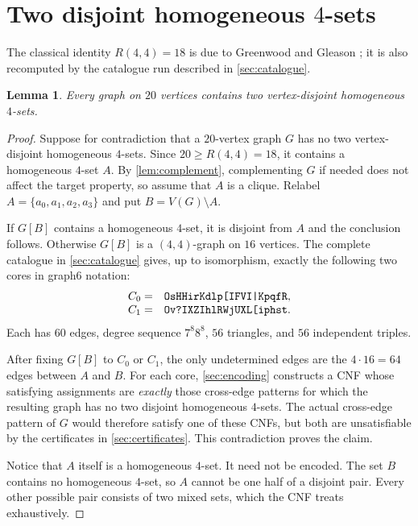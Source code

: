 \documentclass[11pt,a4paper]{article}
\newtheorem{lemma}[theorem]{Lemma}
\theoremstyle{definition}
\theoremstyle{remark}
\newcommand{\corezero}{\texttt{\detokenize{OsHHirKdlp[IFVI|KpqfR}}}
\newcommand{\coreone}{\texttt{\detokenize{Ov?IXZIhlRWjUXL[iphst}}}
\begin{document}
\section{\texorpdfstring{Two disjoint homogeneous \(4\)-sets}{Two disjoint homogeneous 4-sets}}

The classical identity \(R(4,4)=18\) is due to Greenwood and Gleason
\cite{greenwood-gleason}; it is also recomputed by the catalogue run
described in \cref{sec:catalogue}.

\begin{lemma}\label{lem:two-homfour}
Every graph on \(20\) vertices contains two vertex-disjoint homogeneous
\(4\)-sets.
\end{lemma}

\begin{proof}
Suppose for contradiction that a \(20\)-vertex graph \(G\) has no two
vertex-disjoint homogeneous \(4\)-sets.  Since \(20\geq R(4,4)=18\), it contains a
homogeneous \(4\)-set \(A\).  By \cref{lem:complement}, complementing \(G\)
if needed does not affect the target property, so assume that \(A\) is a
clique.  Relabel \(A=\{a_0,a_1,a_2,a_3\}\) and put
\(B=V(G)\setminus A\).

If \(G[B]\) contains a homogeneous \(4\)-set, it is disjoint from \(A\) and
the conclusion follows.  Otherwise \(G[B]\) is a \((4,4)\)-graph on
\(16\) vertices.  The complete catalogue in
\cref{sec:catalogue} gives, up to isomorphism, exactly the following two
cores in graph6 notation:
\[
\begin{array}{ll}
C_0=&\corezero,\\
C_1=&\coreone.
\end{array}
\]
Each has \(60\) edges, degree sequence \(7^8 8^8\), \(56\) triangles, and
\(56\) independent triples.

After fixing \(G[B]\) to \(C_0\) or \(C_1\), the only undetermined edges are
the \(4\cdot16=64\) edges between \(A\) and \(B\).  For each core,
\cref{sec:encoding} constructs a CNF whose satisfying assignments are
\emph{exactly} those cross-edge patterns for which the resulting graph has
no two disjoint homogeneous \(4\)-sets.  The actual cross-edge pattern of
\(G\) would therefore satisfy one of these CNFs, but both are unsatisfiable
by the certificates in \cref{sec:certificates}.  This contradiction proves
the claim.

Notice that \(A\) itself is a homogeneous \(4\)-set.  It need not be
encoded.  The set \(B\) contains no homogeneous \(4\)-set, so \(A\) cannot
be one half of a disjoint pair.  Every other possible pair consists of two
mixed sets, which the CNF treats exhaustively.
\end{proof}
\end{document}
